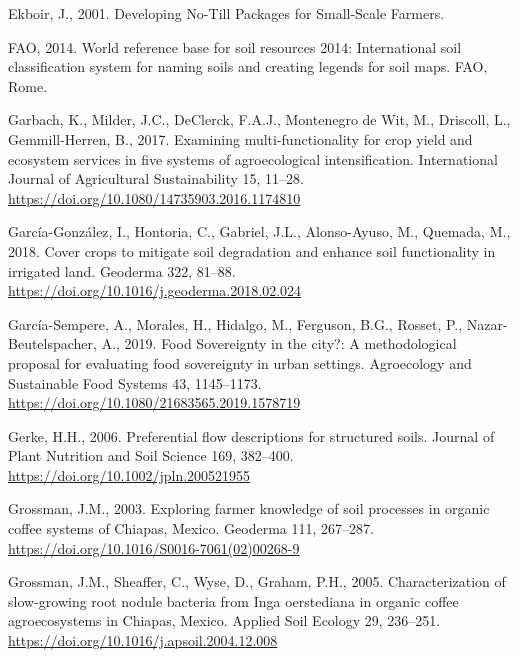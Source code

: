 \documentclass[
  12pt,
]{article}
\newlength{\cslhangindent}
\newlength{\cslentryspacingunit} %
\newenvironment{CSLReferences}[2] %
 {%
  \setlength{\parindent}{0pt}
  \ifodd #1
  \let\oldpar\par
  \def\par{\hangindent=\cslhangindent\oldpar}
  \fi
  \setlength{\parskip}{#2\cslentryspacingunit}
 }%
 {}
\begin{document}
\begin{CSLReferences}{1}{0}
\leavevmode{}%
Ekboir, J., 2001. Developing {No-Till Packages} for {Small-Scale Farmers}.

\leavevmode{}%
FAO, 2014. World reference base for soil resources 2014: International soil classification system for naming soils and creating legends for soil maps. {FAO}, {Rome}.

\leavevmode{}%
Garbach, K., Milder, J.C., DeClerck, F.A.J., Montenegro de Wit, M., Driscoll, L., Gemmill-Herren, B., 2017. Examining multi-functionality for crop yield and ecosystem services in five systems of agroecological intensification. International Journal of Agricultural Sustainability 15, 11--28. \url{https://doi.org/10.1080/14735903.2016.1174810}

\leavevmode{}%
García-González, I., Hontoria, C., Gabriel, J.L., Alonso-Ayuso, M., Quemada, M., 2018. Cover crops to mitigate soil degradation and enhance soil functionality in irrigated land. Geoderma 322, 81--88. \url{https://doi.org/10.1016/j.geoderma.2018.02.024}

\leavevmode{}%
García-Sempere, A., Morales, H., Hidalgo, M., Ferguson, B.G., Rosset, P., Nazar-Beutelspacher, A., 2019. Food {Sovereignty} in the city?: {A} methodological proposal for evaluating food sovereignty in urban settings. Agroecology and Sustainable Food Systems 43, 1145--1173. \url{https://doi.org/10.1080/21683565.2019.1578719}

\leavevmode{}%
Gerke, H.H., 2006. Preferential flow descriptions for structured soils. Journal of Plant Nutrition and Soil Science 169, 382--400. \url{https://doi.org/10.1002/jpln.200521955}

\leavevmode{}%
Grossman, J.M., 2003. Exploring farmer knowledge of soil processes in organic coffee systems of {Chiapas}, {Mexico}. Geoderma 111, 267--287. \url{https://doi.org/10.1016/S0016-7061(02)00268-9}

\leavevmode{}%
Grossman, J.M., Sheaffer, C., Wyse, D., Graham, P.H., 2005. Characterization of slow-growing root nodule bacteria from {Inga} oerstediana in organic coffee agroecosystems in {Chiapas}, {Mexico}. Applied Soil Ecology 29, 236--251. \url{https://doi.org/10.1016/j.apsoil.2004.12.008}


\end{CSLReferences}
\end{document}

